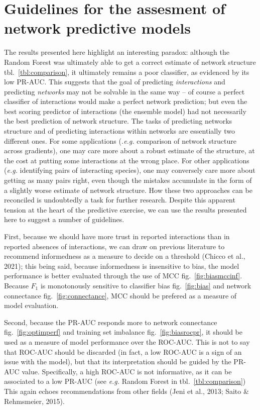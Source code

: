 \documentclass[11pt]{article}
\begin{document}
\hypertarget{guidelines-for-the-assesment-of-network-predictive-models}{%
\section{Guidelines for the assesment of network predictive
models}\label{guidelines-for-the-assesment-of-network-predictive-models}}

The results presented here highlight an interesting paradox: although
the Random Forest was ultimately able to get a correct estimate of
network structure tbl.~\ref{tbl:comparison}, it ultimately remains a
poor classifier, as evidenced by its low PR-AUC. This suggests that the
goal of predicting \emph{interactions} and predicting \emph{networks}
may not be solvable in the same way -- of course a perfect classifier of
interactions would make a perfect network prediction; but even the best
scoring predictor of interactions (the ensemble model) had not
necessarily the best prediction of network structure. The tasks of
predicting networks structure and of predicting interactions within
networks are essentially two different ones. For some applications
(\emph{.e.g.} comparison of network structure across gradients), one may
care more about a robust estimate of the structure, at the cost at
putting some interactions at the wrong place. For other applications
(\emph{e.g.} identifying pairs of interacting species), one may
conversely care more about getting as many pairs right, even though the
mistakes accumulate in the form of a slightly worse estimate of network
structure. How these two approaches can be reconciled is undoubtedly a
task for further research. Despite this apparent tension at the heart of
the predictive exercise, we can use the results presented here to
suggest a number of guidelines.

First, because we should have more trust in reported interactions than
in reported absences of interactions, we can draw on previous literature
to recommend informedness as a measure to decide on a threshold (Chicco
et al., 2021); this being said, because informedness is insensitive to
bias, the model performance is better evaluated through the use of MCC
fig.~\ref{fig:biasmccinf}. Because \(F_1\) is monotonously sensitive to
classifier bias fig.~\ref{fig:bias} and network connectance
fig.~\ref{fig:connectance}, MCC should be prefered as a measure of model
evaluation.

Second, because the PR-AUC responds more to network connectance
fig.~\ref{fig:optimperf} and training set imbalance
fig.~\ref{fig:biasrocpr}, it should be used as a measure of model
performance over the ROC-AUC. This is not to say that ROC-AUC should be
discarded (in fact, a low ROC-AUC is a sign of an issue with the model),
but that its interpretation should be guided by the PR-AUC value.
Specifically, a high ROC-AUC is not informative, as it can be associated
to a low PR-AUC (see \emph{e.g.} Random Forest in
tbl.~\ref{tbl:comparison}) This again echoes recommendations from other
fields (Jeni et al., 2013; Saito \& Rehmsmeier, 2015).
\end{document}
